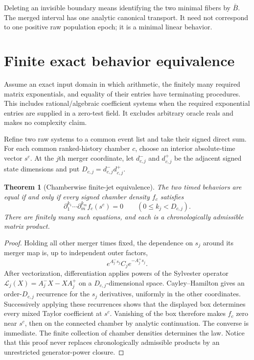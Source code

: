 \documentclass[11pt]{article}
\newtheorem{theorem}{Theorem}[section]
\begin{document}
Deleting an invisible boundary means identifying the two minimal fibers by $\bar B$.  The merged interval has one analytic canonical transport.  It need not correspond to one positive raw population epoch; it is a minimal linear behavior.

\section{Finite exact behavior equivalence}

Assume an exact input domain in which arithmetic, the finitely many required matrix exponentials, and equality of their entries have terminating procedures.  This includes rational/algebraic coefficient systems when the required exponential entries are supplied in a zero-test field.  It excludes arbitrary oracle reals and makes no complexity claim.

Refine two raw systems to a common event list and take their signed direct sum.  For each common ranked-history chamber $c$, choose an interior absolute-time vector $s^c$.  At the $j$th merger coordinate, let $d^-_{c,j}$ and $d^+_{c,j}$ be the adjacent signed state dimensions and put $D_{c,j}=d^-_{c,j}d^+_{c,j}$.

\begin{theorem}[Chamberwise finite-jet equivalence]
The two timed behaviors are equal if and only if every signed chamber density $f_c$ satisfies
\[
\partial_1^{k_1}\cdots\partial_m^{k_m}f_c(s^c)=0
\qquad (0\le k_j<D_{c,j}).
\]
There are finitely many such equations, and each is a chronologically admissible matrix product.
\end{theorem}

\begin{proof}
Holding all other merger times fixed, the dependence on $s_j$ around its merger map is, up to independent outer factors,
\[
e^{A^-_js_j}C_je^{-A^+_js_j}.
\]
After vectorization, differentiation applies powers of the Sylvester operator $\mathcal L_j(X)=A^-_jX-XA^+_j$ on a $D_{c,j}$-dimensional space.  Cayley--Hamilton gives an order-$D_{c,j}$ recurrence for the $s_j$ derivatives, uniformly in the other coordinates.  Successively applying these recurrences shows that the displayed box determines every mixed Taylor coefficient at $s^c$.  Vanishing of the box therefore makes $f_c$ zero near $s^c$, then on the connected chamber by analytic continuation.  The converse is immediate.  The finite collection of chamber densities determines the law.  Notice that this proof never replaces chronologically admissible products by an unrestricted generator-power closure.
\end{proof}
\end{document}

